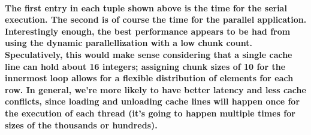 \documentclass[8pt, a4paper, twoside, twoclumn, english]{extreport}
\begin{document}
\paragraph{The first entry in each tuple shown above is the time for the serial execution. The second is of course the time for the parallel application.
Interestingly enough, the best performance appears to be had from using the dynamic parallellization with a low chunk count. Speculatively, this would make sense considering that a single cache line can hold about 16 integers; assigning chunk sizes of 10 for the innermost loop allows for a flexible distribution of elements for each row. In general, we're more likely to have better latency and less cache conflicts, since loading and unloading cache lines will happen once for the execution of each thread (it's going to happen multiple times for sizes of the thousands or hundreds).}
\end{document}
